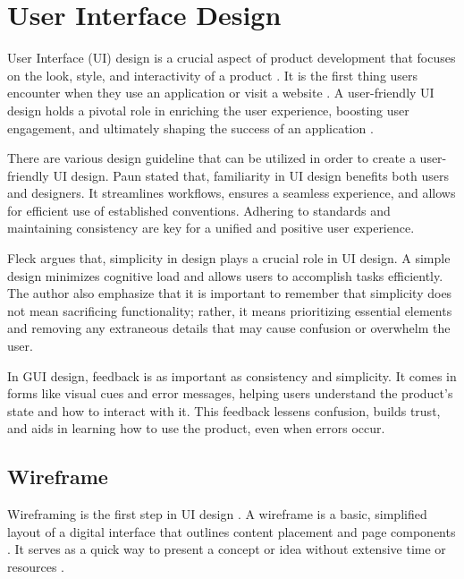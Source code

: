 \section{User Interface Design}
User Interface (UI) design is a crucial aspect of product development that focuses on the look, style, and interactivity of a product \cite{Coursera_2023}. It is the first thing users encounter when they use an application or visit a website \cite{Coursera_2023}.
A user-friendly UI design holds a pivotal role in enriching the user experience, boosting user engagement, and ultimately shaping the success of an application \cite{AlgoRepublic_2023}.

There are various design guideline that can be utilized in order to create a user-friendly UI design. Paun \cite{Paun_2020} stated that, familiarity in UI design benefits both users and designers. It streamlines workflows, ensures a seamless experience, and allows for efficient use of established conventions. Adhering to standards and maintaining consistency are key for a unified and positive user experience.

Fleck \cite{Fleck_2021} argues that, simplicity in design plays a crucial role in UI design.  A simple design minimizes cognitive load and allows users to accomplish tasks efficiently. The author also emphasize that it is important to remember that simplicity does not mean sacrificing functionality; rather, it means prioritizing essential elements and removing any extraneous details that may cause confusion or overwhelm the user.

In GUI design, feedback is as important as consistency and simplicity. It comes in forms like visual cues and error messages, helping users understand the product's state and how to interact with it. This feedback lessens confusion, builds trust, and aids in learning how to use the product, even when errors occur. \cite{Florido_2022}

\subsection{Wireframe}
\label{subsec:wireframe}

Wireframing is the first step in UI design \cite{Gupta_2023} \cite{Chen2020} \cite{Rahmadi2020}. A wireframe is a basic, simplified layout of a digital interface that outlines content placement and page components \cite{White_2023}. It serves as a quick way to present a concept or idea without extensive time or resources \cite{White_2023}.


